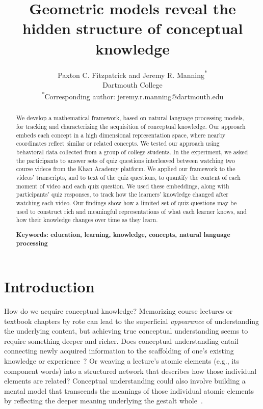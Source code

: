\documentclass[10pt]{article}
\title{Geometric models reveal the hidden structure of conceptual knowledge}
\author{Paxton C. Fitzpatrick and Jeremy R.
Manning\textsuperscript{*}\\Dartmouth
College\\\textsuperscript{*}Corresponding author:
jeremy.r.manning@dartmouth.edu}
\date{}
\begin{document}
\maketitle

\begin{abstract} We develop a mathematical framework, based on natural language
processing models, for tracking and characterizing the acquisition of
conceptual knowledge. Our approach embeds each concept in a high dimensional
representation space, where nearby coordinates reflect similar or related
concepts. We tested our approach using behavioral data collected from a group
of college students. In the experiment, we asked the participants to answer
sets of quiz questions interleaved between watching two course videos from the
Khan Academy platform. We applied our framework to the videos' transcripts, and
to text of the quiz questions, to quantify the content of each moment of video
and each quiz question. We used these embeddings, along with participants' quiz
responses, to track how the learners' knowledge changed after watching each
video. Our findings show how a limited set of quiz questions may be used to
construct rich and meaningful representations of what each learner knows, and
how their knowledge changes over time as they learn.

\textbf{Keywords: education, learning, knowledge, concepts, natural language processing}

\end{abstract}


\section*{Introduction}

How do we acquire conceptual knowledge? Memorizing course lectures or textbook
chapters by rote can lead to the superficial \textit{appearance} of
understanding the underlying content, but achieving true conceptual
understanding seems to require something deeper and richer. Does conceptual
understanding entail connecting newly acquired information to the scaffolding
of one's existing knowledge or experience~\citep{BlayEtal06,CaraMaho03,
ConsEtal16, DeacEtal04, SimoEtal04}? Or weaving a lecture's atomic
elements (e.g., its component words) into a structured network that describes
how those individual elements are related? Conceptual understanding could also
involve building a mental model that transcends the meanings of those
individual atomic elements by reflecting the deeper meaning underlying the
gestalt whole~\citep{Kint70, Macl05, ScotEtal07}.
\end{document}

